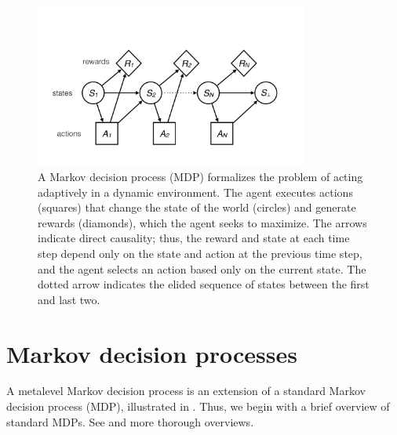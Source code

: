 

\begin{figure}
  \centering
  \includegraphics[width=0.8\textwidth,page=1,trim=0 100 0 200]{diagrams/metamdp.pdf}
  \caption{%
   A Markov decision process (MDP) formalizes the problem of acting adaptively in a dynamic environment. The agent executes actions (squares) that change the state of the world (circles) and generate rewards (diamonds), which the agent seeks to maximize. The arrows indicate direct causality; thus, the reward and state at each time step depend only on the state and action at the previous time step, and the agent selects an action based only on the current state. The dotted arrow indicates the elided sequence of states between the first and last two.
  }
  \label{fig:mdp-diagram}
\end{figure}


\section{Markov decision processes}

A metalevel Markov decision process is an extension of a standard Markov decision process (MDP), illustrated in . Thus, we begin with a brief overview of standard MDPs. See \citet{puterman2014markov} and \citet{sutton2018reinforcement} more thorough overviews.

